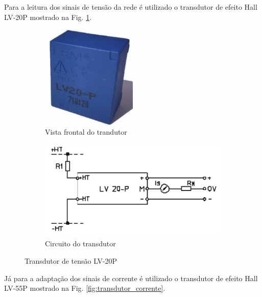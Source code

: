 Para a leitura dos sinais de tensão da rede é utilizado o transdutor de efeito Hall LV-20P mostrado na Fig. \ref{fig:transdutor_tensao}. 

\begin{figure}[!hbt]
	\centering
	\begin{subfigure}[b]{0.4\textwidth}
		\centering
		\includegraphics[width=0.5\textwidth]{figuras/Transdutor_Tensao.jpg}
		\caption{Vista frontal do trandutor}
	\end{subfigure}
	\begin{subfigure}[b]{0.4\textwidth}
		\includegraphics[width=\textwidth]{figuras/Transdutor_Tensao_Circuito.jpg}
		\caption{Circuito do transdutor}
	\end{subfigure}
	\caption{Transdutor de tensão LV-20P}\label{fig:transdutor_tensao}
\end{figure}

Já para a adaptação dos sinais de corrente é utilizado o transdutor de efeito Hall LV-55P mostrado na Fig. \ref{fig:transdutor_corrente}.

